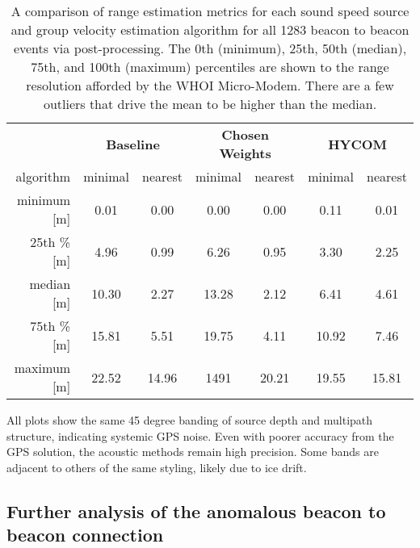 \begin{table}[h!]
\renewcommand{\arraystretch}{1.5}
\centering
\begin{tabular}{r|cc|cc|cc}\toprule
 & \multicolumn{2}{c|}{\textbf{Baseline} } & \multicolumn{2}{c|}{\textbf{Chosen Weights} } & \multicolumn{2}{c}{\textbf{HYCOM}} \\
 algorithm & \cellcolor[HTML]{EFEFEF}minimal & nearest & \cellcolor[HTML]{EFEFEF} minimal& nearest & \cellcolor[HTML]{EFEFEF}minimal & nearest \\ \hline
 minimum [m] 	& \cellcolor[HTML]{EFEFEF}0.01 & 0.00	& \cellcolor[HTML]{EFEFEF}0.00 	& 0.00 	& \cellcolor[HTML]{EFEFEF}0.11 & 0.01 \\
 25th \% [m]   & \cellcolor[HTML]{EFEFEF}4.96 & 0.99	& \cellcolor[HTML]{EFEFEF}6.26 	& 0.95 	& \cellcolor[HTML]{EFEFEF}3.30 & 2.25 \\   
 median [m]		& \cellcolor[HTML]{EFEFEF}10.30 & 2.27 	& \cellcolor[HTML]{EFEFEF}13.28 & 2.12 	& \cellcolor[HTML]{EFEFEF}6.41 & 4.61 \\
 75th \% [m]   & \cellcolor[HTML]{EFEFEF}15.81 & 5.51 	& \cellcolor[HTML]{EFEFEF}19.75 & 4.11 	& \cellcolor[HTML]{EFEFEF}10.92 & 7.46 \\
 maximum [m]    & \cellcolor[HTML]{EFEFEF}22.52 & 14.96 & \cellcolor[HTML]{EFEFEF}1491  & 20.21 & \cellcolor[HTML]{EFEFEF}19.55 & 15.81 \\
 \toprule
\end{tabular}
\caption[Comparison of post-processing range estimation algorithms across all events]{A comparison of range estimation metrics for each sound speed source and group velocity estimation algorithm for all 1283 beacon to beacon events via post-processing. The 0th (minimum), 25th, 50th (median), 75th, and 100th (maximum) percentiles are shown to the range resolution afforded by the WHOI Micro-Modem. There are a few outliers that drive the mean to be higher than the median.}
\label{tab:rangeErrorV1V2}
\end{table}

All plots show the same 45 degree banding of source depth and multipath structure, indicating systemic GPS noise.
Even with poorer accuracy from the GPS solution, the acoustic methods remain high precision.
Some bands are adjacent to others of the same styling, likely due to ice drift.

\FloatBarrier
\subsection{Further analysis of the anomalous beacon to beacon connection}

